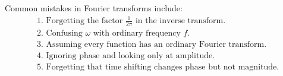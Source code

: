 \begin{conceptbox}
    Common mistakes in Fourier transforms include:
    \[
        \begin{aligned}
             & \text{1. Forgetting the factor } \frac{1}{2\pi} \text{ in the inverse transform.} \\
             & \text{2. Confusing } \omega \text{ with ordinary frequency } f.                   \\
             & \text{3. Assuming every function has an ordinary Fourier transform.}              \\
             & \text{4. Ignoring phase and looking only at amplitude.}                           \\
             & \text{5. Forgetting that time shifting changes phase but not magnitude.}
        \end{aligned}
    \]
\end{conceptbox}